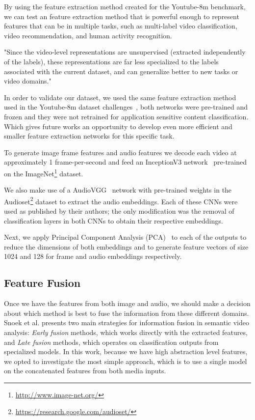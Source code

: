 By using the feature extraction method created for the Youtube-8m benchmark, we can test an feature extraction method that is powerful enough to represent features that can be in multiple tasks, such as multi-label video classification, video recommendation, and human activity recognition.

"Since the video-level representations are unsupervised (extracted independently of the labels), these representations are far less specialized to the labels associated with the current dataset, and can generalize better to new tasks or video domains."~\cite{abu2016youtube}

In order to validate our dataset, we used the same feature extraction method used in the Youtube-8m dataset challenges~\cite{abu2016youtube}, both networks were pre-trained and frozen and they were not retrained for application sensitive content classification. Which gives future works an opportunity to develop even more efficient and smaller feature extraction networks for this specific task.


To generate image frame features and audio features we decode each video at approximately 1 frame-per-second and feed an InceptionV3  network~\cite{szegedy2016rethinking} pre-trained on the ImageNet\footnote{\url{http://www.image-net.org/}} dataset.
 
We also make use of a AudioVGG~\cite{hershey2017cnn} network with pre-trained weights in the Audioset\footnote{\url{https://research.google.com/audioset/}} dataset to extract the audio embeddings. Each of these CNNs were used as published by their authors; the only modification was the removal of classification layers in both CNNs to obtain their respective embeddings.

Next, we apply Principal Component Analysis (PCA)~\cite{wold1987principal} to each of the outputs to reduce the dimensions of both embeddings and to generate feature vectors of size 1024 and 128 for frame and audio embeddings respectively.

\subsection{Feature Fusion}
\label{subsec:feature_fusion}

Once we have the features from both image and audio, we should make a decision about which method is best to fuse the information from these different domains. Snoek et al. \cite{snoek2005featurefusion} presents two main strategies for information fusion in semantic video analysis: \emph{Early fusion} methods, which works directly with the extracted features, and \emph{Late fusion} methods, which operates on classification outputs from specialized models.
In this work, because we have high abstraction level features, we opted to investigate the most simple approach, which is to use a single model on the concatenated features from both media inputs.

